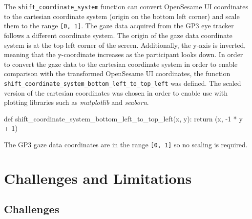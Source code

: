 \documentclass[
  a4paper,
]{article}
\newenvironment{Shaded}{}{}
\newcommand{\ControlFlowTok}[1]{\textcolor[rgb]{0.84,0.23,0.29}{#1}}
\newcommand{\DecValTok}[1]{\textcolor[rgb]{0.00,0.36,0.77}{#1}}
\newcommand{\KeywordTok}[1]{\textcolor[rgb]{0.84,0.23,0.29}{#1}}
\newcommand{\NormalTok}[1]{\textcolor[rgb]{0.14,0.16,0.18}{#1}}
\newcommand{\OperatorTok}[1]{\textcolor[rgb]{0.14,0.16,0.18}{#1}}
\begin{document}
The \texttt{shift\_coordinate\_system} function can convert OpenSesame
UI coordinates to the cartesian coordinate system (origin on the bottom
left corner) and scale them to the range \texttt{{[}0,\ 1{]}}. The gaze
data acquired from the GP3 eye tracker follows a different coordinate
system. The origin of the gaze data coordinate system is at the top left
corner of the screen. Additionally, the y-axis is inverted, meaning that
the y-coordinate increases as the participant looks down. In order to
convert the gaze data to the cartesian coordinate system in order to
enable comparison with the transformed OpenSesame UI coordinates, the
function \texttt{shift\_coordinate\_system\_bottom\_left\_to\_top\_left}
was defined. The scaled version of the cartesian coordinates was chosen
in order to enable use with plotting libraries such as \emph{matplotlib}
and \emph{seaborn}.

\begin{Shaded}
\begin{Highlighting}[]
\KeywordTok{def}\NormalTok{ shift\_coordinate\_system\_bottom\_left\_to\_top\_left(x, y):}
    \ControlFlowTok{return}\NormalTok{ (x, }\OperatorTok{{-}}\DecValTok{1} \OperatorTok{*}\NormalTok{ y }\OperatorTok{+} \DecValTok{1}\NormalTok{)}
\end{Highlighting}
\end{Shaded}

\begin{tcolorbox}[enhanced jigsaw, colback=white, breakable, leftrule=.75mm, colbacktitle=quarto-callout-note-color!10!white, toptitle=1mm, colframe=quarto-callout-note-color-frame, arc=.35mm, opacityback=0, bottomrule=.15mm, title=\textcolor{quarto-callout-note-color}{\faInfo}\hspace{0.5em}{Nota Bene}, titlerule=0mm, opacitybacktitle=0.6, bottomtitle=1mm, rightrule=.15mm, toprule=.15mm, left=2mm, coltitle=black]

The GP3 gaze data coordinates are in the range \texttt{{[}0,\ 1{]}} so
no scaling is required.

\end{tcolorbox}

\hypertarget{challenges-and-limitations}{%
\section{Challenges and Limitations}\label{challenges-and-limitations}}

\hypertarget{challenges}{%
\subsection{Challenges}\label{challenges}}
\end{document}
